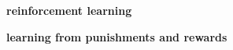 \documentclass[xcolor=dvipsnames]{beamer}
\begin{document}
\begin{frame}{\bf reinforcement learning}

  {\bf learning from punishments and rewards \\}

\end{frame}
\end{document}
